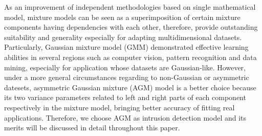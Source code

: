 \documentclass[conference]{IEEEtran}
\begin{document}
As an improvement of independent methodologies based on single mathematical model, mixture models can be seen as a superimposition of certain mixture components having dependencies with each other, therefore, provide outstanding suitability and generality especially for adapting multidimensional datasets. Particularly, Gaussian mixture model (GMM)\cite{Richardson1997} demonstrated effective learning abilities in several regions such as computer vision, pattern recognition and data mining, especially for application whose datasets are Gaussian-like. However, under a more general circumstances regarding to non-Gaussian or asymmetric datesets, asymmetric Gaussian mixture (AGM) model \cite{Elguebaly2014} is a better choice because its two variance parameters related to left and right parts of each component respectively in the mixture model, bringing better accuracy of fitting real applications. Therefore, we choose AGM as intrusion detection model and its merits will be discussed in detail throughout this paper.
\end{document}
